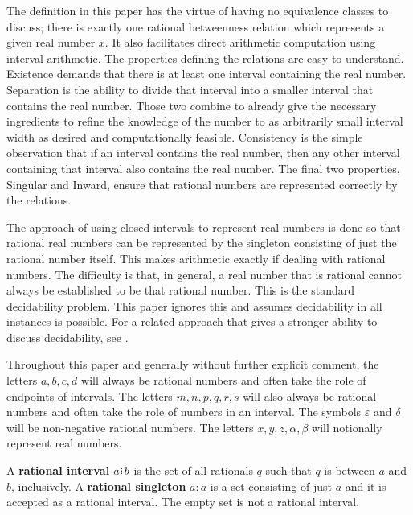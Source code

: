 \documentclass[12pt]{article}
\begin{document}
The definition in this paper has the virtue of having no equivalence classes to discuss; there is exactly one rational betweenness relation which represents a given real number $x$. It also facilitates direct arithmetic computation using interval arithmetic. The properties defining the relations are easy to understand. Existence demands that there is at least one interval containing the real number. Separation is the ability to divide that interval into a smaller interval that contains the real number. Those two combine to already give the necessary ingredients to refine the knowledge of the number to as arbitrarily small interval width as desired and computationally feasible. Consistency is the simple observation that if an interval contains the real number, then any other interval containing that interval also contains the real number. The final two properties, Singular and Inward, ensure that rational numbers are represented correctly by the relations. 

The approach of using closed intervals to represent real numbers is done so that rational real numbers can be represented by the singleton consisting of just the rational number itself. This makes arithmetic exactly if dealing with rational numbers. The difficulty is that, in general, a real number that is rational cannot always be established to be that rational number. This is the standard decidability problem. This paper ignores this and assumes decidability in all instances is possible. For a related approach that gives a stronger ability to discuss decidability, see \cite{taylor24oraclerbr}.

Throughout this paper and generally without further explicit comment, the letters $a, b, c, d$ will always be rational numbers and often take the role of endpoints of intervals. The letters $m, n, p, q, r, s$ will also always be rational numbers and often take the role of numbers in an interval. The symbols $\varepsilon$ and $\delta$ will be non-negative rational numbers. The letters $x, y, z, \alpha, \beta$ will notionally represent real numbers.

 A \textbf{rational interval} $a \rint b$ is the set of all rationals $q$ such that $q$ is between $a$ and $b$, inclusively. A \textbf{rational singleton} $a:a$ is a set consisting of just $a$ and it is accepted as a rational interval. The empty set is not a rational interval. 
\end{document}
